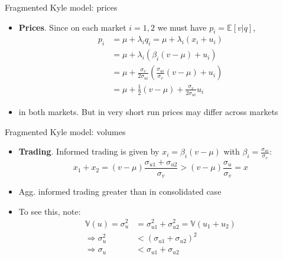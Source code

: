 \documentclass[english,10pt
,aspectratio=169
]{beamer}
\begin{document}
\begin{frame}{Fragmented Kyle model: prices}
	\begin{itemize}
		\item \textbf{Prices}.  Since on each market $i=1,2$ we must have $p_i=\mathbb{E}[v|q]$,
			\begin{align*}
				p_i &= \mu + \lambda_i q_i = \mu + \lambda_i (x_i + u_i)
				\\
				&= \mu + \lambda_i (\beta_i(v-\mu) + u_i)
				\\
				&= \mu + \frac{\sigma_v}{2 \sigma_{ui}} \left( \frac{\sigma_{ui}}{\sigma_v} (v-\mu) + u_i \right)
				\\
				&= \mu + \frac{1}{2}(v-\mu)+\frac{\sigma_v}{2\sigma_{ui}}u_i
			\end{align*}
		
		\item {} in both markets. But in very short run prices may differ across markets
	\end{itemize}
\end{frame}


\begin{frame}{Fragmented Kyle model: volumes}
	\begin{itemize}
		\item \textbf{Trading}. Informed trading is given by $x_i= \beta_i (v-\mu)$ with $\beta_i= \frac{\sigma_{ui}}{\sigma_{v}}$:
		\[
			x_1+x_2 = (v-\mu)\frac{\sigma_{u1}+\sigma_{u2}}{\sigma_v} 
			> 
			(v-\mu)\frac{\sigma_{u}}{\sigma_v} = x
		\]
		
		\item \alert{Agg. informed trading greater than in consolidated case}
		
		\item To see this, note: 
		\begin{align*}
			\mathbb{V}(u) = \sigma_u^2 &= \sigma_{u1}^2 + \sigma_{u2}^2 = \mathbb{V}(u_1+u_2)
			\\
			\Rightarrow
			\sigma_u^2 &< (\sigma_{u1} + \sigma_{u2})^2
			\\
			\Rightarrow
			\sigma_u &< \sigma_{u1} + \sigma_{u2}
		\end{align*}
	\end{itemize}
\end{frame}
\end{document}
